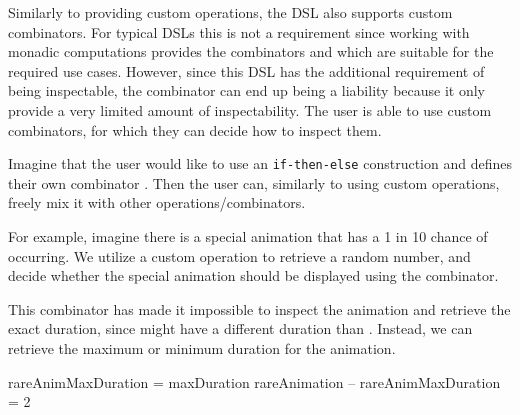 Similarly to providing custom operations, the DSL also supports custom combinators. For typical DSLs this is not a requirement since working with monadic computations provides the combinators \hs{>>=} and  which are suitable for the required use cases. However, since this DSL has the additional requirement of being inspectable, the \hs{>>=} combinator can end up being a liability because it only provide a very limited amount of inspectability. The user is able to use custom combinators, for which they can decide how to inspect them.

Imagine that the user would like to use an \texttt{if-then-else} construction and defines their own combinator . Then the user can, similarly to using custom operations, freely mix it with other operations/combinators.

For example, imagine there is a special animation that has a 1 in 10 chance of occurring. We utilize a custom  operation to retrieve a random number, and decide whether the special animation should be displayed using the  combinator.


This combinator has made it impossible to inspect the animation and retrieve the exact duration, since  might have a different duration than . Instead, we can retrieve the maximum or minimum duration for the animation.

\begin{spec}
rareAnimMaxDuration = maxDuration rareAnimation
-- rareAnimMaxDuration = 2
\end{spec}
